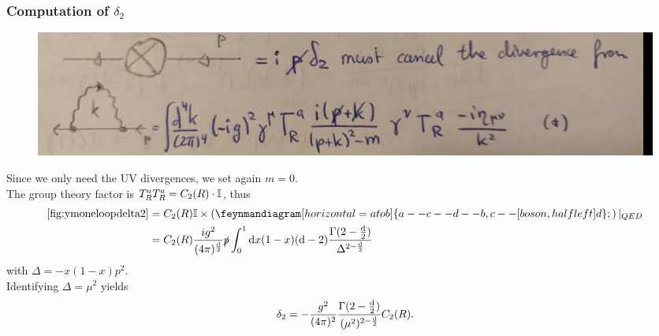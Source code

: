  \subsubsection{Computation of $\delta_2$}
 
\begin{figure}[h!]
	\centering
	\includegraphics[width=0.7\linewidth]{gfx/YMpictures/YMoneLoopDelta2}
	\caption{}
	\label{fig:ymoneloopdelta2}
\end{figure}
 Since we only need the UV divergences, we set again $m=0$.
 \\The group theory factor is $T^a_R T^a_R = C_2(R) \cdot \mathbb{I}$, thus
 \begin{align}
 	\ref{fig:ymoneloopdelta2} &= C_2(R)\mI  \times \left(\feynmandiagram[horizontal=a to b]{a--c--d--b, c--[boson, half left]d};\right)|_{QED} \\
 	&= C_2(R) \frac{i g^2}{(4 \pi)^{\frac{\md}{2}} } \slashed{p} \int_0^1 \md x (1-x)(\md -2 ) \frac{\Gamma(2-\frac{\md}{2})}{\Delta^{2-\frac{\md}{2}}}
 \end{align}
with $\Delta=-x(1-x)p^2$.\\ 
Identifying $\Delta=\mu^2$ yields
\begin{equation}
	\delta_2 = - \frac{g^2}{(4 \pi)^2} \frac{\Gamma(2-\frac{\mathrm{d}}{2})}{(\mu^2)^{2-\frac{\mathrm{d}}{2}} } C_2(R).
\end{equation}


